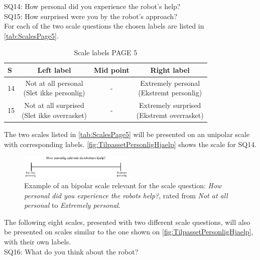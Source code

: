 \noindent
% 
SQ14: How personal did you experience the robot's help?\\%
SQ15: How surprised were you by the robot's approach?\\%
For each of the two scale questions the chosen labels are listed in \autoref{tab:ScalesPage5}. 
%
\begin{table}[H]
	\centering
\caption{Scale labels PAGE 5}
	\label{tab:ScalesPage5} 
	\begin{tabular}{l|c|c|c}
		S     & Left label & Mid point & Right label \\\hline
		14   & \makecell{Not at all personal\\(Slet ikke personlig)}  & - & \makecell{Extremely personal\\(Ekstremt personlig)}        \\\hline
		15   & \makecell{Not at all surprised\\(Slet ikke overrasket)} & - & \makecell{Extremely surprised \\(Ekstremt overrasket)}               
	\end{tabular}        
\end{table}
\noindent
%
The two scales listed in \autoref{tab:ScalesPage5} will be presented on an unipolar scale with corresponding labels. \autoref{fig:TilpassetPersonligHjaelp} shows the scale for SQ14. 
%
\begin{figure}[H]
\centering
\includegraphics[width = 0.49\textwidth]{Figure/TilpassetPersonligHjaelp}
\setlength{} 
\caption{Example of an bipolar scale relevant for the scale question: \textit{How personal did you experience the robots help?}, rated from \textit{Not at all personal} to \textit{Extremely personal}.}
\label{fig:TilpassetPersonligHjaelp}
\end{figure}
\noindent
% 
The following eight scales, presented with two different scale questions, will also be presented on scales similar to the one shown on \autoref{fig:TilpassetPersonligHjaelp}, with their own labels. \\  
SQ16: What do you think about the robot?\\%
